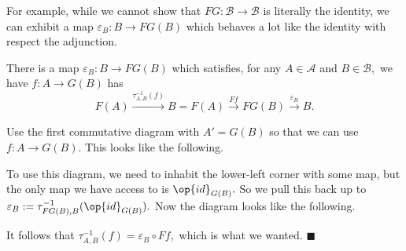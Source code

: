 For example, while we cannot show that $FG:\mathcal B\to\mathcal B$ is literally the identity, we can exhibit a map $\varepsilon_B:B\to FG(B)$ which behaves a lot like the identity with respect the adjunction.
\begin{lemma}
    There is a map $\varepsilon_B:B\to FG(B)$ which satisfies, for any $A\in\mathcal A$ and $B\in\mathcal B,$ we have $f:A\to G(B)$ has
    \[F(A)\stackrel{\tau_{A,B}^{-1}(f)}\longrightarrow B=F(A)\stackrel{Ff}\longrightarrow FG(B)\stackrel{\varepsilon_B}\longrightarrow B.\]
\end{lemma}
Use the first commutative diagram with $A'=G(B)$ so that we can use $f:A\to G(B).$ This looks like the following.
\begin{center}
\end{center}
To use this diagram, we need to inhabit the lower-left corner with some map, but the only map we have access to is $\op{id}_{G(B)}.$ So we pull this back up to $\varepsilon_B:=\tau_{FG(B),B}^{-1}(\op{id}_{G(B)}).$ Now the diagram looks like the following.
\begin{center}
\end{center}
It follows that $\tau_{A,B}^{-1}(f)=\varepsilon_B\circ Ff,$ which is what we wanted. $\blacksquare$

